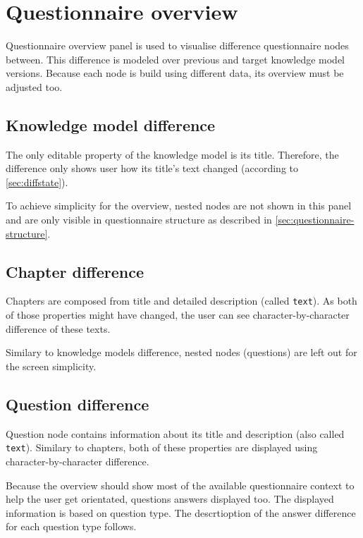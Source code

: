 \section{Questionnaire overview}\label{sec:questionnaire-overview}

Questionnaire overview panel is used to visualise difference questionnaire nodes between.
This difference is modeled over previous and target knowledge model versions.
Because each node is build using different data, its overview must be adjusted too.

\subsection{Knowledge model difference}

The only editable property of the knowledge model is its title.
Therefore, the difference only shows user how its title's text changed (according to \ref{sec:diffstate}).

To achieve simplicity for the overview, nested nodes are not shown in this panel and are only visible in questionnaire structure as described in \ref{sec:questionnaire-structure}.

\subsection{Chapter difference}

Chapters are composed from title and detailed description (called \texttt{text}).
As both of those properties might have changed, the user can see character-by-character difference of these texts.

Similary to knowledge models difference, nested nodes (questions) are left out for the screen simplicity.

\subsection{Question difference}

Question node contains information about its title and description (also called \texttt{text}).
Similary to chapters, both of these properties are displayed using character-by-character difference.

Because the overview should show most of the available questionnaire context to help the user get orientated, questions answers displayed too.
The displayed information is based on question type.
The descrtioption of the answer difference for each question type follows.

